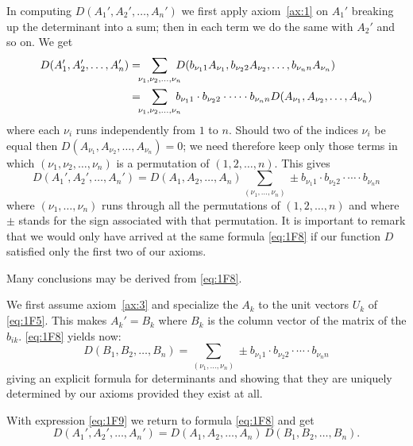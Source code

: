 \documentclass[10pt,leqno]{article}
\theoremstyle{definition}
\begin{document}
In computing $D(A_1', A_2', \ldots, A_n')$ we first apply axiom~\ref{ax:1} on $A_1'$ breaking up the determinant into a sum; then in each term we do the same with $A_2'$ and so on.
We get
\begin{align}
\label{eq:1F7}
D(A_1', A_2', \ldots, A_n')
&= 
\!\!\!
\sum_{\nu_1,\nu_2,\ldots,\nu_n} 
\!\!\!\!
D(
        b_{\nu_1 1} A_{\nu_1},
        b_{\nu_2 2} A_{\nu_2},
        \ldots,
        b_{\nu_n n} A_{\nu_n}
)
\\
&= 
\!\!\!
\sum_{\nu_1,\nu_2,\ldots,\nu_n} 
\!\!\!\!
b_{\nu_1 1} \cdot
b_{\nu_2 2} \cdot
\cdots \cdot
b_{\nu_n n}
D(A_{\nu_1}, A_{\nu_2}, \ldots, A_{\nu_n})
\notag
\end{align}
where each $\nu_i$ runs independently from $1$ to $n$.
Should two of the indices $\nu_i$ be equal then $D(A_{\nu_1}, A_{\nu_2}, \ldots, A_{\nu_n}) = 0$; we need therefore keep only those terms in which $(\nu_1, \nu_2, \ldots, \nu_n)$ is a permutation of $(1,2,\ldots, n)$.
This gives
\begin{equation}
\label{eq:1F8}
D(A_1', A_2', \ldots, A_n')
= D(A_1, A_2, \ldots, A_n)
\!\!\!
\sum_{(\nu_1, \ldots, \nu_n)}
\!\!\!\!
\pm b_{\nu_1 1} \cdot b_{\nu_2 2} \cdot \cdots \cdot b_{\nu_n n}
\end{equation}
where $(\nu_1, \ldots, \nu_n)$ runs through all the permutations of $(1,2,\ldots,n)$ and where $\pm$ stands for the sign associated with that permutation.
It is important to remark that we would only have arrived at the same formula \eqref{eq:1F8} if our function $D$ satisfied only the first two of our axioms.

Many conclusions may be derived from \eqref{eq:1F8}.

We first assume axiom~\ref{ax:3} and specialize the $A_k$ to the unit vectors $U_k$ of \eqref{eq:1F5}.
This makes $A_k' = B_k$ where $B_k$ is the column vector of the matrix of the $b_{ik}$. \eqref{eq:1F8} yields now:
\begin{equation}
\label{eq:1F9}
D(B_1, B_2, \ldots, B_n)
= 
\!\!\!
\sum_{(\nu_1, \ldots, \nu_n)}
\!\!\!\!
\pm b_{\nu_1 1} \cdot b_{\nu_2 2} \cdot \cdots \cdot b_{\nu_n n}
\end{equation}
giving an explicit formula for determinants and showing that they are uniquely determined by our axioms provided they exist at all.

With expression \eqref{eq:1F9} we return to formula \eqref{eq:1F8} and get
\begin{equation}
\label{eq:1F10}
D(A_1', A_2', \ldots, A_n')
= 
D(A_1, A_2, \ldots, A_n)
\,
D(B_1, B_2, \ldots, B_n).
\end{equation}
\end{document}
